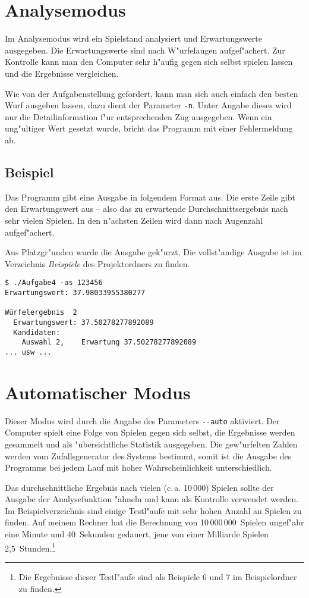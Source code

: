 \documentclass{scrreprt}
\begin{document}
\section{Analysemodus}
Im Analysemodus wird ein Spielstand analysiert und Erwartungswerte ausgegeben.
Die Erwartungswerte sind nach W"urfelaugen aufgef"achert.  Zur Kontrolle kann
man den Computer sehr h"aufig gegen sich selbst spielen lassen und die
Ergebnisse vergleichen.

Wie von der Aufgabenstellung gefordert, kann man sich auch einfach den besten
Wurf ausgeben lassen, dazu dient der Parameter \texttt{-n}.  Unter Angabe dieses
wird nur die Detailinformation f"ur entsprechenden Zug ausgegeben. Wenn ein
ung"ultiger Wert gesetzt wurde, bricht das Programm mit einer Fehlermeldung ab.

\subsection*{Beispiel}
Das Programm gibt eine Ausgabe in folgendem Format aus. Die erste Zeile gibt den
Erwartungswert aus -- also das zu erwartende Durchschnittsergebnis nach sehr
vielen Spielen.  In den n"achsten Zeilen wird dann nach Augenzahl aufgef"achert.

Aus Platzgr"unden wurde die Ausgabe gek"urzt, Die vollst"andige Ausgabe ist im
Verzeichnis \emph{Beispiele} des Projektordners zu finden.

\begin{verbatim}
$ ./Aufgabe4 -as 123456
Erwartungswert: 37.98033955380277

Würfelergebnis  2
  Erwartungswert: 37.50278277892089
  Kandidaten:
    Auswahl 2,    Erwartung 37.50278277892089
... usw ...
\end{verbatim}

\section{Automatischer Modus}
Dieser Modus wird durch die Angabe des Parameters \texttt{-\/-auto} aktiviert.
Der Computer spielt eine Folge von Spielen gegen sich selbst, die Ergebnisse
werden gesammelt und als "ubersichtliche Statistik ausgegeben.  Die gew"urfelten
Zahlen werden vom Zufallsgenerator des Systems bestimmt, somit ist die Ausgabe
des Programms bei jedem Lauf mit hoher Wahrscheinlichkeit unterschiedlich.

Das durchschnittliche Ergebnis nach vielen (c.\,a. 10\,000) Spielen sollte der
Ausgabe der Analysefunktion "ahneln und kann als Kontrolle verwendet werden. Im
Beispielverzeichnis sind einige Testl"aufe mit sehr hohen Anzahl an Spielen zu
finden. Auf meinem Rechner hat die Berechnung von 10\,000\,000~Spielen ungef"ahr
eine Minute und 40~Sekunden gedauert, jene von einer Milliarde Spielen
2,5~Stunden.\footnote{Die Ergebnisse dieser Testl"aufe sind als Beispiele 6 und
7 im Beispielordner zu finden.}
\end{document}
